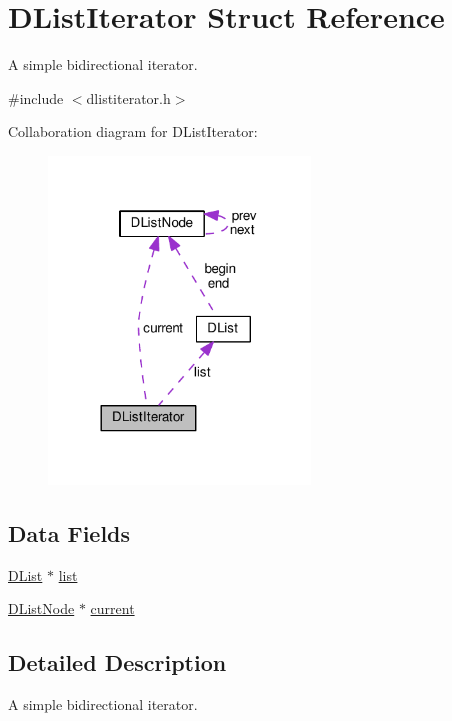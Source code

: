 \hypertarget{structDListIterator}{}\section{D\+List\+Iterator Struct Reference}
\label{structDListIterator}


A simple bidirectional iterator.  




{\ttfamily \#include $<$dlistiterator.\+h$>$}



Collaboration diagram for D\+List\+Iterator\+:\nopagebreak
\begin{figure}[H]
\begin{center}
\leavevmode
\includegraphics[width=197pt]{structDListIterator__coll__graph}
\end{center}
\end{figure}
\subsection*{Data Fields}
\begin{DoxyCompactItemize}
\item 
\hyperlink{structDList}{D\+List} $\ast$ \hyperlink{structDListIterator_ad948282c06cc2a1c796699443404c73f}{list}
\item 
\hyperlink{structDListNode}{D\+List\+Node} $\ast$ \hyperlink{structDListIterator_a5f347829fbf97fb211160150628db997}{current}
\end{DoxyCompactItemize}


\subsection{Detailed Description}
A simple bidirectional iterator. 

